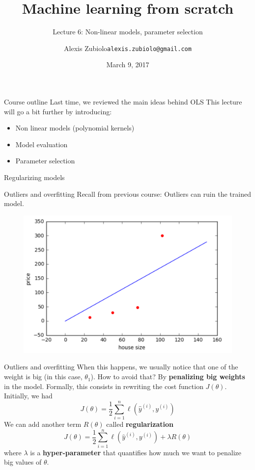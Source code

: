\documentclass{beamer}
\title{Machine learning from scratch}
\subtitle{Lecture 6: Non-linear models, parameter selection}
\author{Alexis Zubiolo\newline\texttt{alexis.zubiolo@gmail.com}}
\institute{Data Science Team Lead @ Adcash}
\date{March 9, 2017}
\newcommand{\1}[1]{\mathbbm{1}\left[#1\right]}
\newcommand{\yi}{y^{(i)}}
\newcommand{\yhati}{\hat{y}^{(i)}}
\begin{document}
\begin{frame}
  \titlepage
\end{frame}

\begin{frame}{Course outline}
Last time, we reviewed the main ideas behind OLS
\vfill
\pause
This lecture will go a bit further by introducing:
\begin{itemize}
	\item Non linear models (polynomial kernels)
	\item Model evaluation
	\item Parameter selection
\end{itemize}
\end{frame}

\begin{frame}
	\center
	\huge{Regularizing models}
\end{frame}

\begin{frame}{Outliers and overfitting}
Recall from previous course: Outliers can ruin the trained model.
\pause
\vfill
\begin{figure}
\centering
\includegraphics[width=\linewidth]{images/line_regression_outlier.png}
\end{figure}
\end{frame}

\begin{frame}{Outliers and overfitting}
When this happens, we usually notice that one of the weight is big (in this case, $\theta_1$).
\pause
\vfill
How to avoid that? \pause By \textbf{penalizing big weights} in the model.
\pause
\vfill 
Formally, this consists in rewriting the cost function $J(\theta)$. Initially, we had 
\begin{equation*}
J(\theta) = \dfrac{1}{2} \sum_{i = 1}^{n} \ell \left( \yhati, \yi \right)
\end{equation*}
\pause
\vfill 
We can add another term $R(\theta)$ called \textbf{regularization}
\begin{equation*}
J(\theta) = \dfrac{1}{2} \sum_{i = 1}^{n} \ell \left( \yhati, \yi \right) + \lambda R(\theta)
\end{equation*}
\pause
\vfill
where $\lambda$ is a \textbf{hyper-parameter} that quantifies how much we want to penalize big values of $\theta$.
\end{frame}
\end{document}
